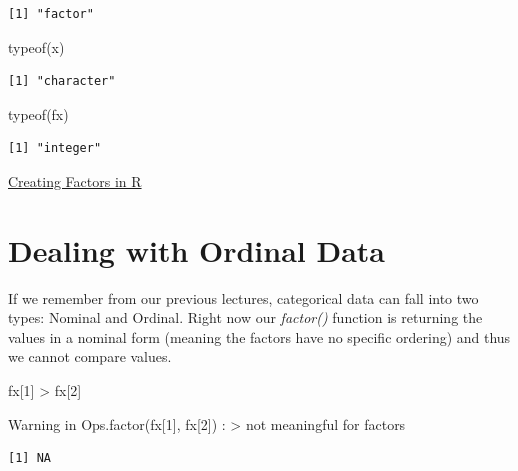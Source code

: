 \documentclass[
  letterpaper,
  DIV=11,
  numbers=noendperiod]{scrreprt}
\newenvironment{Shaded}{\begin{snugshade}}{\end{snugshade}}
\newcommand{\DecValTok}[1]{\textcolor[rgb]{0.68,0.00,0.00}{#1}}
\newcommand{\FunctionTok}[1]{\textcolor[rgb]{0.28,0.35,0.67}{#1}}
\newcommand{\NormalTok}[1]{\textcolor[rgb]{0.00,0.23,0.31}{#1}}
\newcommand{\SpecialCharTok}[1]{\textcolor[rgb]{0.37,0.37,0.37}{#1}}
\begin{document}
\begin{verbatim}
[1] "factor"
\end{verbatim}

\begin{Shaded}
\begin{Highlighting}[]
\FunctionTok{typeof}\NormalTok{(x)}
\end{Highlighting}
\end{Shaded}

\begin{verbatim}
[1] "character"
\end{verbatim}

\begin{Shaded}
\begin{Highlighting}[]
\FunctionTok{typeof}\NormalTok{(fx)}
\end{Highlighting}
\end{Shaded}

\begin{verbatim}
[1] "integer"
\end{verbatim}

\begin{watch}{}{}
    \href{https://youtu.be/UoPKvEKD9K4}{Creating Factors in R}
\end{watch}

\section{Dealing with Ordinal Data}\label{dealing-with-ordinal-data}

If we remember from our previous lectures, categorical data can fall
into two types: Nominal and Ordinal. Right now our \emph{factor()}
function is returning the values in a nominal form (meaning the factors
have no specific ordering) and thus we cannot compare values.

\begin{Shaded}
\begin{Highlighting}[]
\NormalTok{fx[}\DecValTok{1}\NormalTok{] }\SpecialCharTok{\textgreater{}}\NormalTok{ fx[}\DecValTok{2}\NormalTok{]}
\end{Highlighting}
\end{Shaded}

{Warning in Ops.factor(fx{[}1{]}, fx{[}2{]}) :
\textquotesingle\textgreater\textquotesingle{} not meaningful for
factors}

\begin{verbatim}
[1] NA
\end{verbatim}
\end{document}
